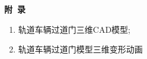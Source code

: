 \newpage
\begin{center}
    \textbf{附~录}
\end{center}
\begin{enumerate}[label= \arabic*]
    \item 轨道车辆过道门三维CAD模型;
    \item 轨道车辆过道门模型三维变形动画
\end{enumerate}

